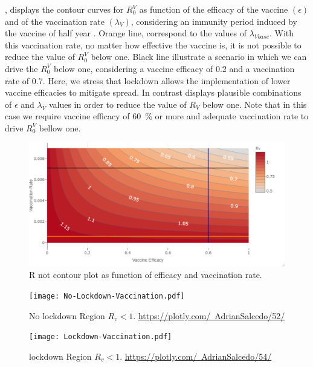 , displays the contour curves for $ R_0^V $ as function
of the efficacy of the vaccine $ (\epsilon) $ and of the vaccination rate 
$(\lambda_V)$, considering an immunity period induced by the vaccine of half year . 
Orange line, correspond to the values of $\lambda_{Vbase}$. With this vaccination
rate, no matter how effective the vaccine is, it is not possible
to reduce the value of $R_0^V$ below one. Black line illustrate a scenario in
which we can drive the $R_0^V$  below one, considering a vaccine
efficacy of \num{0.2} and a  vaccination rate of \num{0.7}.
Here, we stress that lockdown allows the implementation of lower vaccine
efficacies to mitigate spread.
In contrast  displays  plausible
combinations of $\epsilon$ and $\lambda_V$ values
in order to reduce the value of $R_V$ below one. Note that in this case
we require vaccine efficacy of \SI{60}{\percent} or more and
adequate vaccination rate to drive $R_0^V$ bellow one.
\begin{figure}[tbh]
    \centering
      \includegraphics[scale=0.5, keepaspectratio]{Figures/Rv_contour}
    \caption{R not contour plot as function of efficacy and vaccination rate.}
    \label{fig:rvcontour1}
\end{figure}
%
\begin{figure}[tbh]
    \centering
      \texttt{[image: No-Lockdown-Vaccination.pdf]}
    \caption{No lockdown Region $R_v<1$.
    \href{https://plotly.com/~AdrianSalcedo/52/}{%
		https://plotly.com/~AdrianSalcedo/52/}
    }
    \label{fig:Nolockdown}
\end{figure}
%
%
\begin{figure}[tbh]
    \centering
      \texttt{[image: Lockdown-Vaccination.pdf]}
    \caption{lockdown Region $R_v<1$.
        \href{https://plotly.com/~AdrianSalcedo/54/}{%
		https://plotly.com/~AdrianSalcedo/54/}
    }
    \label{fig:Lockdown}
\end{figure}
